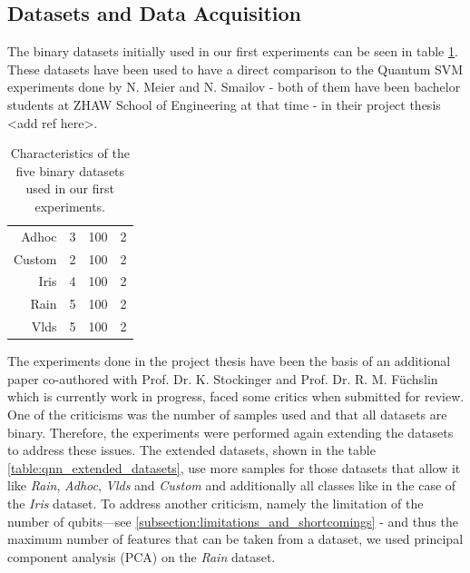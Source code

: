 \subsection{Datasets and Data Acquisition}
The binary datasets initially used in our first experiments can be seen in table \ref{table:qnn_binary_datasets}. These datasets have been used to have a direct comparison to the Quantum SVM experiments done by N. Meier and N. Smailov - both of them have been bachelor students at ZHAW School of Engineering at that time - in their project thesis <add ref here>. 

\begin{table}[!h]
	\centering
	\begin{tabular}{rccc}
		\hline 
		\thead{\textbf{Dataset}} & \thead{\textbf{\#Features}} & \thead{\textbf{\#Records}} & \thead{\textbf{\#Classes}} \\
		\hline 
		Adhoc   & 3         & 100      & 2        \\
		Custom  & 2         & 100      & 2        \\
		Iris    & 4         & 100      & 2        \\
		Rain    & 5         & 100      & 2        \\
		Vlds    & 5         & 100      & 2        \\
		\hline
	\end{tabular}
	\caption{Characteristics of the five binary datasets used in our first experiments.}
	\label{table:qnn_binary_datasets}
\end{table}

The experiments done in the project thesis have been the basis of an additional paper co-authored with Prof. Dr. K. Stockinger and Prof. Dr. R. M. Füchslin which is currently work in progress, faced some critics when submitted for review. 
One of the criticisms was the number of samples used and that all datasets are binary. Therefore, the experiments were performed again extending the datasets to address these issues. The extended datasets, shown in the table \ref{table:qnn_extended_datasets}, use more samples for those datasets that allow it like \textit{Rain}, \textit{Adhoc}, \textit{Vlds} and \textit{Custom} and additionally all classes like in the case of the \textit{Iris} dataset. To address another criticism, namely the limitation of the number of qubits—see \ref{subsection:limitations_and_shortcomings} - and thus the maximum number of features that can be taken from a dataset, we used principal component analysis (PCA) on the \textit{Rain} dataset.

